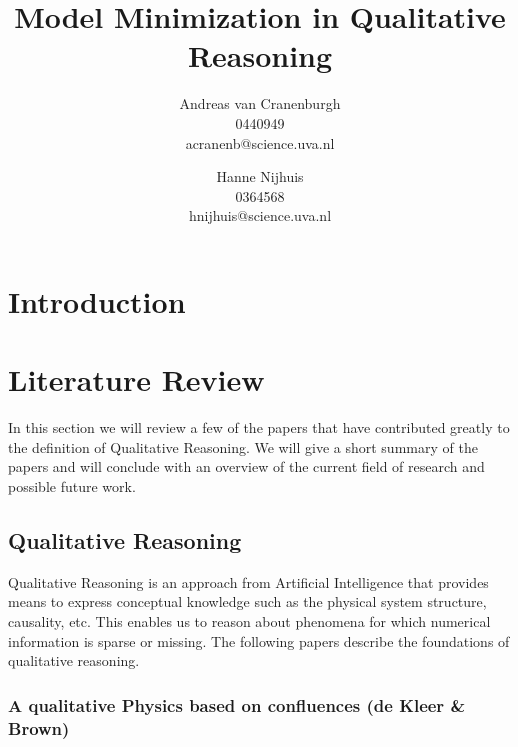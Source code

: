 \documentclass{article} %
\title{Model Minimization in Qualitative Reasoning}
\author{Andreas van Cranenburgh \\ 0440949 \\ acranenb@science.uva.nl 
\and Hanne Nijhuis \\ 0364568 \\ hnijhuis@science.uva.nl}
\begin{document}
\maketitle


\vspace{4em}


\newpage

\tableofcontents

\newpage

\section{Introduction}

\section{Literature Review}

In this section we will review a few of the papers that have contributed
greatly to the definition of Qualitative Reasoning. We will give a short
summary of the papers and will conclude with an overview of the current field
of research and possible future work. 

\subsection{Qualitative Reasoning}
Qualitative Reasoning is an approach from Artificial Intelligence that 
provides means to express conceptual knowledge such as the physical system 
structure, causality, etc.
This enables us to reason about phenomena for which numerical information 
is sparse or missing.
The following papers describe the foundations of qualitative reasoning.

\subsubsection{A qualitative Physics based on confluences (de Kleer \& Brown)}
\end{document}
